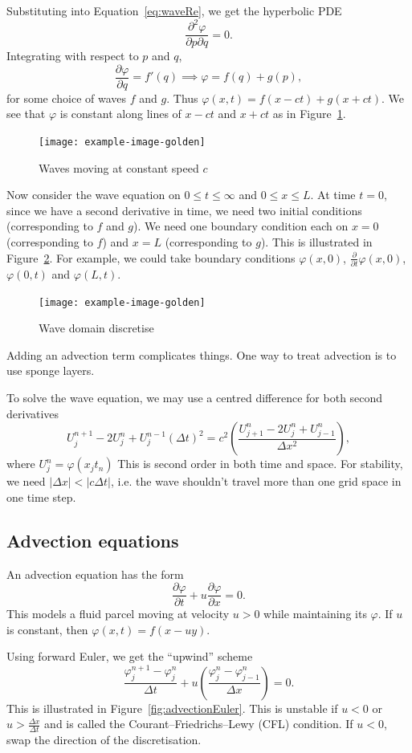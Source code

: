 \documentclass[11pt, a4paper]{article}
\renewcommand{\phi}{\varphi}
\theoremstyle{break}
\newcommand*{\size}[1]{|#1|}%
\newcommand*{\Paren}[1]{\left(#1\right)}%
\newcommand{\dt}{\Delta t}
\newcommand{\dx}{\Delta x}
\newcommand{\der}[2]{\frac{\partial #1}{\partial #2}}
\begin{document}
Substituting into Equation~\ref{eq:waveRe}, we get the hyperbolic PDE \[\der{^2\phi}{p\partial q}=0.\]
Integrating with respect to $p$ and $q$, \[\der\phi q=f'(q) \implies \phi = f(q)+g(p),\] for some choice of waves $f$ and $g$. Thus $\phi(x, t)=f(x-ct)+g(x+ct)$. We see that $\phi$ is constant along lines of $x-ct$ and $x+ct$ as in Figure~\ref{fig:waveMove}.

\begin{figure}\centering
	\texttt{[image: example-image-golden]}
	\caption{Waves moving at constant speed $c$}\label{fig:waveMove}
\end{figure}


	Now consider the wave equation on $0\leq t\leq \infty$ and $0\leq x\leq L$. At time $t=0$, since we have a second derivative in time, we need two initial conditions (corresponding to $f$ and $g$). We need one boundary condition each on $x=0$ (corresponding to $f$) and $x=L$ (corresponding to $g$). This is illustrated in Figure~\ref{fig:waveDomain}. For example, we could take boundary conditions $\phi(x,0)$, $\der{}t\phi(x,0)$, $\phi(0,t)$ and $\phi(L,t)$.
	
	\begin{figure}\centering
		\texttt{[image: example-image-golden]}
		\caption{Wave domain discretise}\label{fig:waveDomain}
	\end{figure}
	
	 Adding an advection term complicates things. One way to treat advection is to use sponge layers.
	 
	 To solve the wave equation, we may use a centred difference for both second derivatives \[U_j^{n+1}-2U_j^n+U_j^{n-1}{(\dt)^2}=c^2\Paren{\frac{U^n_{j+1}-2U_j^n+U^n_{j-1}}{\dx^2}},\] where $U_j^n = \phi(x_jt_n)$ This is second order in both time and space. For stability, we need $\size{\dx}<\size{c\dt}$, i.e. the wave shouldn't travel more than one grid space in one time step.
	

\subsection{Advection equations}
An advection equation has the form \[\der\phi t+u\der\phi x=0.\] This models a fluid parcel moving at velocity $u>0$ while maintaining its $\phi$. If $u$ is constant, then $\phi(x,t)=f(x-uy)$.

Using forward Euler, we get the ``upwind'' scheme \[\frac{\phi_j^{n+1}-\phi_j^n}{\dt}+u\Paren{\frac{\phi^n_j-\phi^n_{j-1}}{\dx}}=0.\] This is illustrated in Figure~\ref{fig:advectionEuler}. This is unstable if $u<0$ or $u>\frac{\dx}{\dt}$ and is called the Courant–Friedrichs–Lewy (CFL) condition. If $u<0$, swap the direction of the discretisation.
\end{document}
